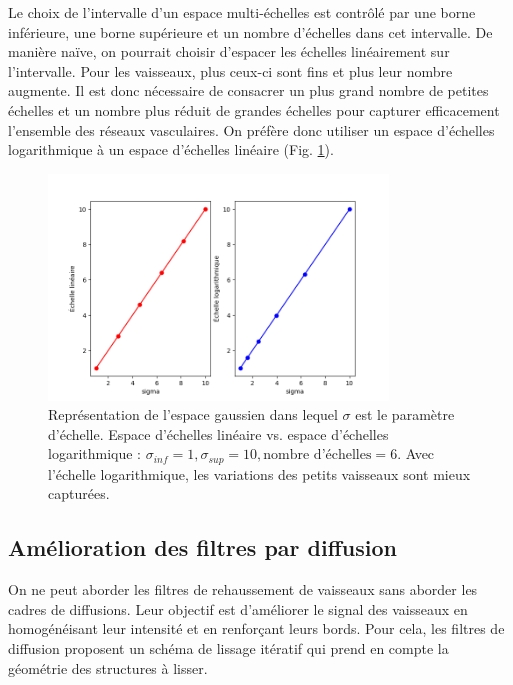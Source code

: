   Le choix de l'intervalle d'un espace multi-échelles est contrôlé par une borne inférieure, une borne supérieure et un nombre d'échelles dans cet intervalle. De manière naïve, on pourrait choisir d'espacer les échelles linéairement sur l'intervalle. Pour les vaisseaux, plus ceux-ci sont fins et plus leur nombre augmente. Il est donc nécessaire de consacrer un plus grand nombre de petites échelles  et un nombre plus réduit de grandes échelles pour capturer efficacement l'ensemble des réseaux vasculaires. On préfère donc utiliser un espace d'échelles logarithmique à un espace d'échelles linéaire (Fig. \ref{fig:scale_space}).
  \begin{figure}[!ht]
    \centering
    \includegraphics[height=6cm]{Images/scale_space.png}
    \caption{Représentation de l'espace gaussien dans lequel $\sigma$ est le paramètre d'échelle. Espace d'échelles linéaire vs. espace d'échelles logarithmique : $\sigma_{inf}=1, \sigma_{sup}=10, \textrm{nombre d'échelles}=6$. Avec l'échelle logarithmique, les variations des petits vaisseaux sont mieux capturées.}
    \label{fig:scale_space}
  \end{figure}

\subsection{Amélioration des filtres par diffusion}
\label{sec:EA:rehaussement:diffusion}
On ne peut aborder les filtres de rehaussement de vaisseaux sans aborder les cadres de diffusions. Leur objectif est d'améliorer le signal des vaisseaux en homogénéisant leur intensité et en renforçant leurs bords. Pour cela, les filtres de diffusion proposent un schéma de lissage itératif qui prend en compte la géométrie des structures à lisser.


